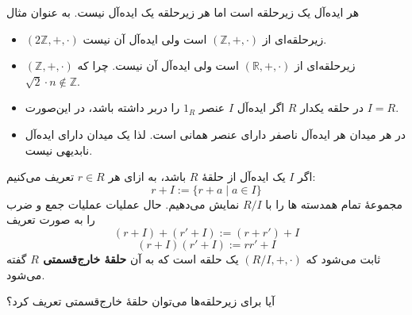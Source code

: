 \begin{frame}
    \begin{example}
        هر ایده‌آل یک زیرحلقه است اما هر زیرحلقه یک ایده‌آل نیست. به عنوان مثال
        \begin{itemize}
            \item   $(2\mathbb{Z}, +, \cdot)$ زیرحلقه‌ای از $(\mathbb{Z}, +, \cdot)$ است ولی ایده‌آل آن نیست.
            \item  $(\mathbb{Z}, +, \cdot)$ زیرحلقه‌ای از $(\mathbb{R}, +, \cdot)$ است ولی ایده‌آل آن نیست. چرا که \( \sqrt{2} \cdot  n \not \in \mathbb{Z}\).
        \end{itemize}
    \end{example}

    \begin{remark}
        \begin{itemize}
            \item در حلقه یکدار
                  $R$
                  اگر ایده‌آل
                  \(I\)
                  عنصر
                  \(1_R\)
                  را دربر داشته باشد، در این‌صورت
                  \(I = R\).
            \item در هر میدان هر ایده‌آل ناصفر دارای عنصر همانی است. لذا یک میدان دارای ایده‌آل نابدیهی نیست.
        \end{itemize}

    \end{remark}

\end{frame}

\begin{frame}
    \begin{definition}
        اگر $I$ یک ایده‌آل از حلقهٔ $R$ باشد، به ازای هر \(r \in R\) تعریف می‌کنیم:
        \[
            r + I := \{ r + a \mid a \in I \}
        \]
        مجموعهٔ تمام همدسته ها را با \(R/I\) نمایش می‌دهیم. حال عملیات عملیات جمع و ضرب  را به صورت تعریف
        \[
            (r + I) + (r' + I) := (r + r') + I
        \]
        \[
            (r + I)(r' + I) := rr' + I
        \]
        ثابت می‌شود که $(R/I, +, \cdot)$ یک حلقه است که به آن \textbf{حلقهٔ خارج‌قسمتی $R$}   گفته می‌شود.

    \end{definition}


    \begin{remark}
        آیا برای زیرحلقه‌ها می‌توان حلقهٔ خارج‌قسمتی تعریف کرد؟
    \end{remark}

\end{frame}


